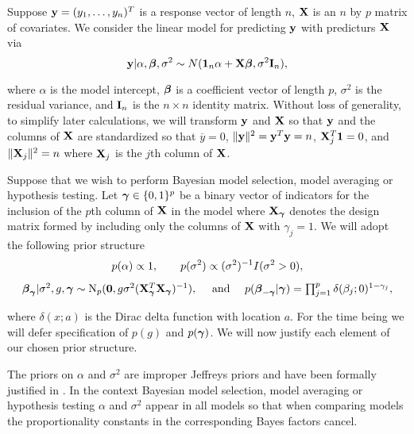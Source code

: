 Suppose ${\bf y} = (y_1,\ldots,y_n)^T$ is a response vector of length $n$, ${\bf X}$ is an $n$ by $p$ matrix 
of covariates. We consider the linear model for predicting ${\bf y}$ with predicturs ${\bf X}$ via
\begin{equation}
\label{eq:linearModel}
{\bf y} | \alpha, {\boldsymbol \beta}, \sigma^2 \sim N({\bf 1}_n\alpha + {\bf X} {\boldsymbol \beta}, \sigma^2 {\bf I}_n),
\end{equation} 


\noindent where $\alpha$ is the model intercept, ${\boldsymbol \beta}$ is a coefficient vector of length $p$, 
$\sigma^2$ is the residual variance, and ${\bf I}_n$ is the $n \times n$ identity matrix. 
Without loss of generality, to simplify later calculations, we will transform ${\bf y}$ and ${\bf X}$ 
so that ${\bf y}$ and the columns of ${\bf X}$ are standardized so that $\overline{y} = 0$, 
$\|{\bf y}\|^2 = {\bf y}^T{\bf y} = n$, ${\bf X}_j^T{\bf 1} = 0$,  and $\|{\bf X}_j\|^2 = n$ where ${\bf X}_j$ is the $j$th  column of ${\bf X}$. 

Suppose that we wish to perform Bayesian model selection, model averaging or hypothesis 
testing. Let ${\boldsymbol \gamma} \in \{0, 1\}^p$ be a binary vector of indicators
for the inclusion of the $p$th column of ${\bf X}$ in the model where ${\bf X}_{\boldsymbol \gamma}$ 
denotes the design matrix formed by including only the columns of ${\bf X}$ with 
$\gamma_j = 1$. We will adopt the following prior structure
\begin{equation}
\label{eq:priorStructure}
\begin{array}{c}
\displaystyle p(\alpha) \propto 1,  
\qquad 
\displaystyle p(\sigma^2) \propto (\sigma^2)^{-1} I(\sigma^2 > 0),                      
\\ [2ex]
{\boldsymbol\beta}_{\boldsymbol \gamma} | \sigma^2, g, {\boldsymbol \gamma} \sim \text{N}_p({\bf 0}, g \sigma^2 ({\bf X}_{\boldsymbol \gamma}^T {\bf X}_{\boldsymbol \gamma})^{-1}),
\quad \text{ and }  \quad 
p({\boldsymbol \beta}_{-{\boldsymbol \gamma}}|{\boldsymbol \gamma}) = \prod_{j=1}^p \delta(\beta_j;0)^{1-\gamma_j},
\end{array}
\end{equation} 

\noindent where $\delta(x;a)$ is the Dirac delta function with location $a$. 
For the time being we will defer specification of $p(g)$ and $p({\boldsymbol \gamma})$.
We will now justify each element of our chosen prior structure.

The priors on $\alpha$ and $\sigma^2$ are improper Jeffreys priors and have been formally justified 
in \cite{Berger2012}. In the context Bayesian model selection, model averaging or hypothesis 
testing $\alpha$ and $\sigma^2$ appear in all models 
so that when comparing models the proportionality constants in the corresponding
Bayes factors cancel.


